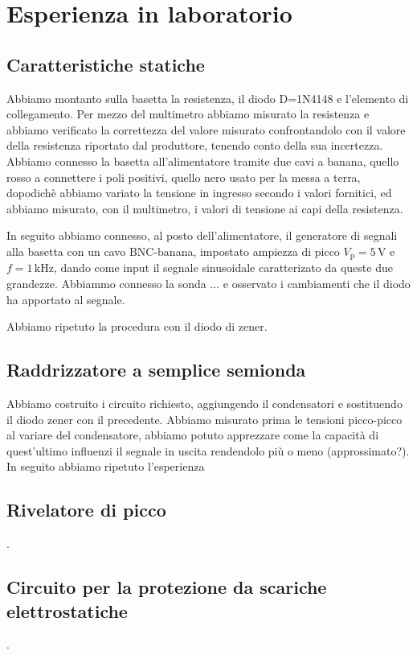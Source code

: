 \documentclass[a4paper]{article}
\begin{document}
{{	\section{Esperienza in laboratorio}
		\subsection{Caratteristiche statiche}
			Abbiamo montanto sulla basetta la resistenza, il diodo D=1N4148 e l'elemento di collegamento.
			Per mezzo del multimetro abbiamo misurato la resistenza e abbiamo verificato la correttezza del valore misurato confrontandolo con il valore della resistenza riportato dal produttore, tenendo conto della sua incertezza.
			Abbiamo connesso la basetta all'alimentatore tramite due cavi a banana, quello rosso a connettere i poli positivi, quello nero usato per la messa a terra, dopodichè abbiamo variato la tensione in ingresso secondo i valori fornitici, ed abbiamo misurato, con il multimetro, i valori di tensione ai capi della resistenza.
			
			In seguito abbiamo connesso, al posto dell'alimentatore, il generatore di segnali alla basetta con un cavo BNC-banana, impostato ampiezza di picco $ V_{\mathrm{p}} = 5 \, \mathrm{V} $ e $ f = 1 \, \mathrm{kHz} $, dando come input il segnale sinusoidale caratterizato da queste due grandezze.
			Abbiammo connesso la sonda ... e osservato i cambiamenti che il diodo ha apportato al segnale.
			
			Abbiamo ripetuto la procedura con il diodo di zener.
		\subsection{Raddrizzatore a semplice semionda}
			Abbiamo costruito i circuito richiesto, aggiungendo il condensatori e sostituendo il diodo zener con il precedente.
			Abbiamo misurato prima le tensioni picco-picco al variare del condensatore, abbiamo potuto apprezzare come la capacità di quest'ultimo influenzi il segnale in uscita rendendolo più o meno (approssimato?).
			In seguito abbiamo ripetuto l'esperienza 
			
		\subsection{Rivelatore di picco}
			.
		\subsection{Circuito per la protezione da scariche elettrostatiche}
			.
}}
\end{document}
